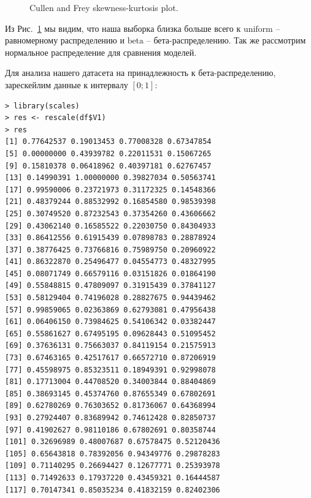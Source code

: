 \documentclass[14pt,a4paper]{scrartcl}
\begin{document}
\begin{figure}[t!]
	\caption{Cullen and Frey skewness-kurtosis plot.}
	\label{ris:cullen_and_frey_graph}
\end{figure}

\pagebreak
Из Рис.~\ref{ris:cullen_and_frey_graph} мы видим, что наша выборка близка больше всего к $\text{uniform}$ -- равномерному распределению и $\text{beta}$ -- бета-распределению. Так же рассмотрим нормальное распределение для сравнения моделей.

Для анализа нашего датасета на принадлежность к бета-распределению, зарескейлим данные к интервалу $[0;1]$:
\begin{lstlisting}
> library(scales)
> res <- rescale(df$V1)
> res
[1] 0.77642537 0.19013453 0.77008328 0.67347854
[5] 0.00000000 0.43939782 0.22011531 0.15067265
[9] 0.15810378 0.06418962 0.40397181 0.62767457
[13] 0.14990391 1.00000000 0.39827034 0.50563741
[17] 0.99590006 0.23721973 0.31172325 0.14548366
[21] 0.48379244 0.88532992 0.16854580 0.98539398
[25] 0.30749520 0.87232543 0.37354260 0.43606662
[29] 0.43062140 0.16585522 0.22030750 0.84304933
[33] 0.86412556 0.61915439 0.07898783 0.28878924
[37] 0.38776425 0.73766816 0.75989750 0.20960922
[41] 0.86322870 0.25496477 0.04554773 0.48327995
[45] 0.08071749 0.66579116 0.03151826 0.01864190
[49] 0.55848815 0.47809097 0.31915439 0.37841127
[53] 0.58129404 0.74196028 0.28827675 0.94439462
[57] 0.99859065 0.02363869 0.62793081 0.47956438
[61] 0.06406150 0.73984625 0.54106342 0.03382447
[65] 0.55861627 0.67495195 0.09628443 0.51095452
[69] 0.37636131 0.75663037 0.84119154 0.21575913
[73] 0.67463165 0.42517617 0.66572710 0.87206919
[77] 0.45598975 0.85323511 0.18949391 0.92998078
[81] 0.17713004 0.44708520 0.34003844 0.88404869
[85] 0.38693145 0.45374760 0.87655349 0.67802691
[89] 0.62780269 0.76303652 0.81736067 0.64368994
[93] 0.27924407 0.83689942 0.74612428 0.82850737
[97] 0.41902627 0.98110186 0.67802691 0.80358744
[101] 0.32696989 0.48007687 0.67578475 0.52120436
[105] 0.65643818 0.78392056 0.94349776 0.29878283
[109] 0.71140295 0.26694427 0.12677771 0.25393978
[113] 0.71492633 0.17937220 0.43459321 0.16444587
[117] 0.70147341 0.85035234 0.41832159 0.82402306
\end{lstlisting}
\end{document}
